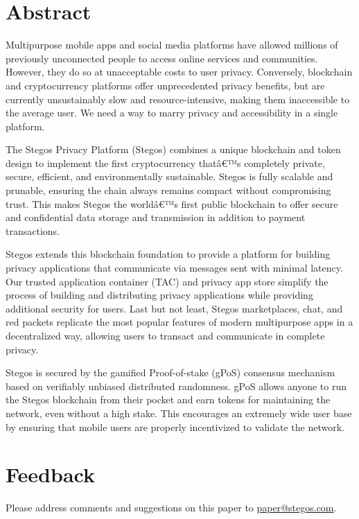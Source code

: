 \documentclass[8pt,fleqn,openany]{book}
\begin{document}
\newpage

\tableofcontents\newpage

\section{Abstract}
Multipurpose mobile apps and social media platforms have allowed millions of previously unconnected people to access online services and communities. However, they do so at unacceptable costs to user privacy. Conversely, blockchain and cryptocurrency platforms offer unprecedented privacy benefits, but are currently unsustainably slow and resource-intensive, making them inaccessible to the average user. We need a way to marry privacy and accessibility in a single platform.

The Stegos Privacy Platform (Stegos) combines a unique blockchain and token design to implement the first cryptocurrency thatâ€™s completely private, secure, efficient, and environmentally sustainable. Stegos is fully scalable and prunable, ensuring the chain always remains compact without compromising trust. This makes Stegos the worldâ€™s first public blockchain to offer secure and confidential data storage and transmission in addition to payment transactions. 

Stegos extends this blockchain foundation to provide a platform for building privacy applications that communicate via messages sent with minimal latency. Our trusted application container (TAC) and privacy app store simplify the process of building and distributing privacy applications while providing additional security for users. Last but not least, Stegos marketplaces, chat, and red packets replicate the most popular features of modern multipurpose apps in a decentralized way, allowing users to transact and communicate in complete privacy.

Stegos is secured by the gamified Proof-of-stake (gPoS) consensus mechanism based on verifiably unbiased distributed randomness. gPoS allows anyone to run the Stegos blockchain from their pocket and earn tokens for maintaining the network, even without a high stake. This encourages an extremely wide user base by ensuring that mobile users are properly incentivized to validate the network.
\section{Feedback}

Please address comments and suggestions on this paper to \href{mailto:paper@stegos.com}{paper@stegos.com}.
\end{document}
